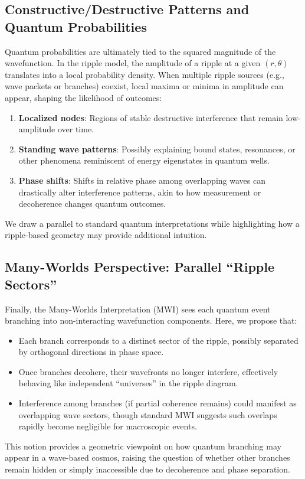 \documentclass[11pt]{article}
\begin{document}
\subsection{Constructive/Destructive Patterns and Quantum Probabilities}
\label{subsec:constructive-destructive}
Quantum probabilities are ultimately tied to the squared magnitude 
of the wavefunction. In the ripple model, the amplitude of a ripple 
at a given \((r,\theta)\) translates into a local probability density. 
When multiple ripple sources (e.g., wave packets or branches) 
coexist, local maxima or minima in amplitude can appear, shaping 
the likelihood of outcomes:
\begin{enumerate}
  \item \textbf{Localized nodes}: Regions of stable destructive 
        interference that remain low-amplitude over time.
  \item \textbf{Standing wave patterns}: Possibly explaining 
        bound states, resonances, or other phenomena reminiscent 
        of energy eigenstates in quantum wells.
  \item \textbf{Phase shifts}: Shifts in relative phase among 
        overlapping waves can drastically alter interference 
        patterns, akin to how measurement or decoherence changes 
        quantum outcomes.
\end{enumerate}
We draw a parallel to standard quantum interpretations while 
highlighting how a ripple-based geometry may provide additional 
intuition.

\subsection{Many-Worlds Perspective: Parallel ``Ripple Sectors''}
\label{subsec:manyworlds-ripples}
Finally, the Many-Worlds Interpretation (MWI) sees each quantum 
event branching into non-interacting wavefunction components. 
Here, we propose that:
\begin{itemize}
  \item Each branch corresponds to a distinct sector of the ripple, 
        possibly separated by orthogonal directions in phase space. 
  \item Once branches decohere, their wavefronts no longer interfere, 
        effectively behaving like independent ``universes'' in the 
        ripple diagram.
  \item Interference among branches (if partial coherence remains) 
        could manifest as overlapping wave sectors, though standard 
        MWI suggests such overlaps rapidly become negligible for 
        macroscopic events.
\end{itemize}
This notion provides a geometric viewpoint on how quantum branching 
may appear in a wave-based cosmos, raising the question of whether 
other branches remain hidden or simply inaccessible due to decoherence 
and phase separation.
\end{document}
